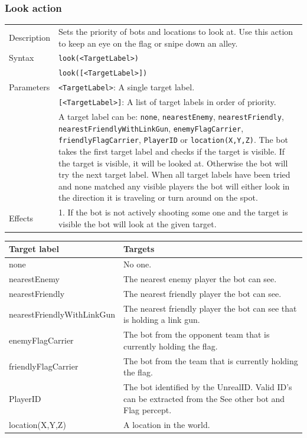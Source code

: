 \documentclass[11pt,a4paper]{article}
\begin{document}
\subsubsection*{Look action}
\begin{small}
\begin{tabular}{p{2cm}p{9cm}}
Description & Sets the priority of bots and locations to look at. Use this action to keep an eye on the flag or snipe down an alley. \\
Syntax & \verb|look(<TargetLabel>)|\\
	& \verb|look([<TargetLabel>])|\\

Parameters 	& \verb|<TargetLabel>|: A single target label. \\
		& \verb|[<TargetLabel>]|: A list of target labels in order of priority.\\
		&  A target label can be:  \verb|none|, \verb|nearestEnemy|, \verb|nearestFriendly|, \verb|nearestFriendlyWithLinkGun|, \verb|enemyFlagCarrier|, \verb|friendlyFlagCarrier|, \verb|PlayerID| or \verb|location(X,Y,Z)|. The bot takes the first target label and checks if the target is visible. If the target is visible, it will be looked at. Otherwise the bot will try the next target label. When all target labels have been tried and none matched any visible players the bot will either look in the direction it is traveling or turn around on the spot.\\
Effects & 1.	If the bot is not actively shooting some one and the target is visible the bot will look at the given target. 
\end{tabular}

\begin{tabular}{|p{4cm}|p{7cm}|}	
	\hline
Target label & Targets\\
\hline
none & No one. \\
nearestEnemy & The nearest enemy player the bot can see. \\
nearestFriendly &  The nearest friendly player the bot can see. \\
nearestFriendlyWithLinkGun & The nearest friendly player the bot can see that is holding a link gun. \\
enemyFlagCarrier & The bot from the opponent team that is currently holding the flag. \\
friendlyFlagCarrier & The bot from the team that is currently holding the flag.\\
PlayerID & The bot identified by the UnrealID. Valid ID's can be extracted from the See other bot and Flag percept. \\
location(X,Y,Z) & A location in the world.\\

\hline
\end{tabular}
\end{small}
\end{document}
